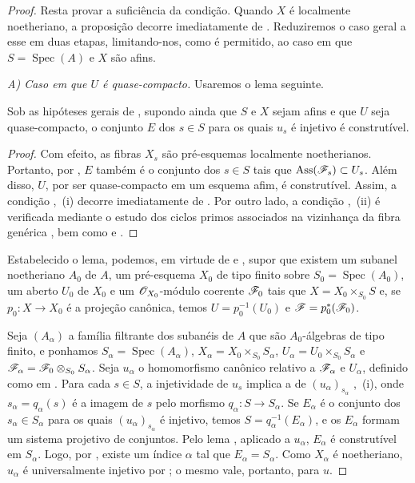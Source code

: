 \begin{proof}
Resta provar a
suficiência da
condição. Quando
$X$ é localmente
noetheriano, a
proposição decorre
imediatamente de
.
Reduziremos o caso
geral a esse em
duas etapas,
limitando-nos, como
é permitido, ao caso
em que
$S=\operatorname{Spec}(A)$
e $X$ são afins.

\medskip
\emph{A) Caso em que
$U$ é quase-compacto.}
Usaremos o lema
seguinte.

\begin{lemma}[11.9.17.1]
\label{IV.11.9.17.1}
Sob as hipóteses gerais
de ,
supondo ainda que $S$
e $X$ sejam afins e
que $U$ seja
quase-compacto, o
conjunto $E$ dos
$s\in S$ para os quais
$u_s$ é injetivo é
construtível.
\end{lemma}

\begin{proof}
Com efeito, as fibras
$X_s$ são
pré-esquemas
localmente
noetherianos.
Portanto, por
,
$E$ também é o
conjunto dos
$s\in S$ tais que
$\operatorname{Ass}
(\mathscr{F}_s)\subset U_s$.
Além disso, $U$,
por ser quase-compacto
em um esquema afim,
é construtível.
Assim, a condição
,~(i)
decorre imediatamente
de .
Por outro lado, a
condição
,~(ii)
é verificada mediante
o estudo dos ciclos
primos associados
na vizinhança da
fibra genérica
,
bem como
e .
\end{proof}

Estabelecido o lema,
podemos, em virtude
de 
e ,
supor que existem
um subanel noetheriano
$A_0$ de $A$,
um pré-esquema
$X_0$ de tipo
finito sobre
$S_0=\operatorname{Spec}(A_0)$,
um aberto $U_0$
de $X_0$ e um
$\mathscr{O}_{X_0}$-módulo
coerente $\mathscr{F}_0$
tais que
$X=X_0\times_{S_0}S$
e, se
$p_0:X\to X_0$
é a projeção
canônica, temos
$U=p_0^{-1}(U_0)$
e
$\mathscr{F}=p_0^*
(\mathscr{F}_0)$.

Seja $(A_\alpha)$
a família filtrante
dos subanéis de
$A$ que são
$A_0$-álgebras
de tipo finito,
e ponhamos
$S_\alpha=
\operatorname{Spec}(A_\alpha)$,
$X_\alpha=
X_0\times_{S_0}S_\alpha$,
$U_\alpha=
U_0\times_{S_0}S_\alpha$
e
$\mathscr{F}_\alpha=
\mathscr{F}_0\otimes_{S_0}
S_\alpha$.
Seja $u_\alpha$
o homomorfismo
canônico relativo
a $\mathscr{F}_\alpha$
e $U_\alpha$,
definido como em
.
Para cada $s\in S$,
a injetividade de
$u_s$ implica a de
$(u_\alpha)_{s_\alpha}$
,~(i),
onde
$s_\alpha=q_\alpha(s)$
é a imagem de $s$
pelo morfismo
$q_\alpha:S\to
S_\alpha$.
Se $E_\alpha$ é
o conjunto dos
$s_\alpha\in S_\alpha$
para os quais
$(u_\alpha)_{s_\alpha}$
é injetivo, temos
$S=q_\alpha^{-1}
(E_\alpha)$, e
os $E_\alpha$
formam um sistema
projetivo de conjuntos.
Pelo lema
,
aplicado a $u_\alpha$,
$E_\alpha$ é
construtível em
$S_\alpha$. Logo,
por ,
existe um índice
$\alpha$ tal que
$E_\alpha=S_\alpha$.
Como $X_\alpha$
é noetheriano,
$u_\alpha$ é
universalmente
injetivo por
;
o mesmo vale,
portanto, para $u$.


\end{proof}
